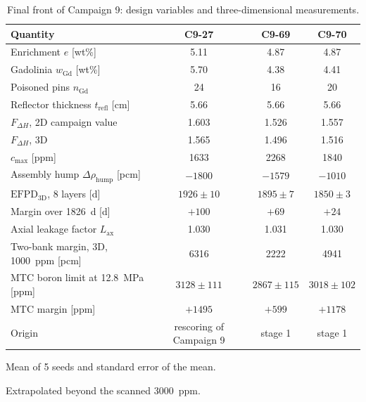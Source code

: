 \begin{table}[htbp]
  \centering
  \small
  \begin{threeparttable}
  \caption{Final front of Campaign 9: design variables and three-dimensional measurements.}
  \label{tab:concl-front}
  \setlength{\tabcolsep}{4pt}
  \begin{tabular}{@{}lccc@{}}
    \toprule
    Quantity & C9-27 & C9-69 & C9-70 \\
    \midrule
    Enrichment $e$ [wt\%] & 5.11 & 4.87 & 4.87 \\
    Gadolinia $w_\mathrm{Gd}$ [wt\%] & 5.70 & 4.38 & 4.41 \\
    Poisoned pins $n_\mathrm{Gd}$ & 24 & 16 & 20 \\
    Reflector thickness $t_\mathrm{refl}$ [cm] & 5.66 & 5.66 & 5.66 \\
    $F_{\Delta H}$, 2D campaign value & 1.603 & 1.526 & 1.557 \\
    $F_{\Delta H}$, 3D & 1.565 & 1.496 & 1.516 \\
    $c_\mathrm{max}$ [ppm] & 1633 & 2268 & 1840 \\
    Assembly hump $\Delta\rho_\mathrm{hump}$ [pcm] & $-1800$ & $-1579$ & $-1010$ \\
    $\mathrm{EFPD}_\mathrm{3D}$, 8 layers [d] & $1926 \pm 10$\tnote{a} & $1895 \pm 7$ & $1850 \pm 3$\tnote{a} \\
    Margin over \SI{1826}{d} [d] & $+100$ & $+69$ & $+24$ \\
    Axial leakage factor $L_\mathrm{ax}$ & 1.030 & 1.031 & 1.030 \\
    Two-bank margin, 3D, \SI{1000}{ppm} [pcm] & 6316 & 2222 & 4941 \\
        MTC boron limit at \SI{12.8}{MPa} [ppm] & $3128 \pm 111$\tnote{b} & $2867 \pm 115$ & $3018 \pm 102$\tnote{b} \\
    MTC margin [ppm] & $+1495$ & $+599$ & $+1178$ \\
    Origin & rescoring of Campaign 9 & stage 1 & stage 1 \\
    \bottomrule
  \end{tabular}
  \begin{tablenotes}[flushleft]\footnotesize
    \item[a] Mean of 5 seeds and standard error of the mean.
        \item[b] Extrapolated beyond the scanned \SI{3000}{ppm}.
  \end{tablenotes}
  \end{threeparttable}
\end{table}

